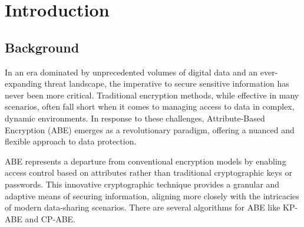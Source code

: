 \chapter{Introduction}

\section{Background}

\hspace{10mm}
In an era dominated by unprecedented volumes of digital data and an ever-expanding threat landscape, the imperative to secure sensitive information has never been more critical. Traditional encryption methods, while effective in many scenarios, often fall short when it comes to managing access to data in complex, dynamic environments. In response to these challenges, Attribute-Based Encryption (ABE) emerges as a revolutionary paradigm, offering a nuanced and flexible approach to data protection.

ABE represents a departure from conventional encryption models by enabling access control based on attributes rather than traditional cryptographic keys or passwords. This innovative cryptographic technique provides a granular and adaptive means of securing information, aligning more closely with the intricacies of modern data-sharing scenarios. There are several algorithms for ABE like KP-ABE and CP-ABE.

